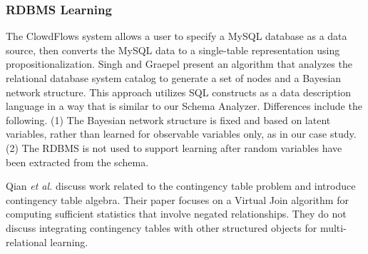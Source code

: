 \subsubsection{RDBMS Learning}
The ClowdFlows system \cite{Lavravc2014} allows a user to specify a MySQL database as a data source, then converts the MySQL data to a single-table representation using propositionalization. 
Singh and Graepel \cite{Singh2013} present an algorithm that analyzes the relational database system catalog to generate a set of nodes and a Bayesian network structure. 
This approach utilizes SQL constructs as a data description language in a way that is similar to our Schema Analyzer. 
Differences include the following. (1) The Bayesian network structure is fixed and based on latent variables, rather than learned for observable variables only, as in our case study. (2) The RDBMS is not used to support learning after random variables have been extracted from the schema. 

Qian {\em et al.} \cite{Qian2014a}  discuss work related to the contingency table problem and introduce contingency table algebra. Their paper focuses on a Virtual Join algorithm for computing sufficient statistics that involve negated relationships. They do not discuss integrating contingency tables with other structured objects for multi-relational learning. 
%


